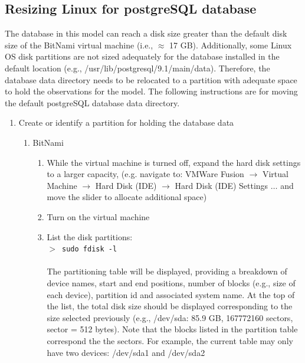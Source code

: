 \subsection{Resizing Linux for postgreSQL database}
\label{sec:dbresize}
The database in this model can reach a disk size greater than the default disk size of the BitNami virtual machine (i.e., $\approx$ 17 GB).   
Additionally, some Linux OS disk partitions are not sized adequately for the database installed in the default location (e.g., /usr/lib/postgresql/9.1/main/data).  
Therefore, the database data directory needs to be relocated to a partition with adequate space to hold the observations for the model.  
The following instructions are for moving the default postgreSQL database data directory.

\begin{enumerate}
    \item Create or identify a partition for holding the database data
    \begin{enumerate}
        \item BitNami
        \begin{enumerate}
            \item While the virtual machine is turned off, expand the hard disk 
                  settings to a larger capacity, (e.g. navigate to: VMWare Fusion 
	               $\rightarrow$ Virtual Machine $\rightarrow$ Hard Disk (IDE) 
	               $\rightarrow$ Hard Disk (IDE) Settings $\ldots$ and move the 
	               slider to allocate additional space)
            \item Turn on the virtual machine
            \item List the disk partitions:\\
                  $>$~\texttt{sudo fdisk -l}\\
                  \\
                  The partitioning table will be displayed, providing a breakdown
    	           of device names, start and end positions, number of blocks 
    	           (e.g., size of each device), partition id and associated system
    	           name.  At the top of the list, the total disk size should be 
    	           displayed corresponding to the size selected previously 
    	           (e.g., /dev/sda: 85.9 GB, 167772160 sectors, sector = 512 
    	           bytes).  Note that the blocks listed in the partition table 
    	           correspond the the sectors.  For example, the current table
    	           may only have two devices: /dev/sda1 and /dev/sda2 

\end{enumerate}
\end{enumerate}
\end{enumerate}
